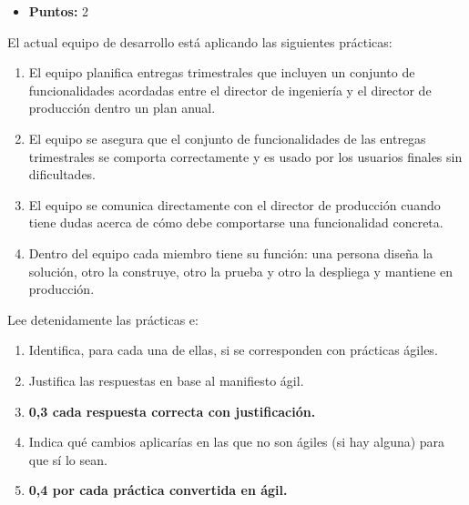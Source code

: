 

\begin{itemize}
    \item \textbf{Puntos:} 2
\end{itemize}
\begin{enunciado}
    El actual equipo de desarrollo está aplicando las siguientes prácticas:
    \begin{enumerate}
        \item El equipo planifica entregas trimestrales que incluyen un conjunto de funcionalidades acordadas entre el director de ingeniería y el director de producción dentro un plan anual.
        \item El equipo se asegura que el conjunto de funcionalidades de las entregas trimestrales se comporta correctamente y es usado por los usuarios finales sin dificultades.
        \item El equipo se comunica directamente con el director de producción cuando tiene dudas acerca de cómo debe comportarse una funcionalidad concreta.
        \item Dentro del equipo cada miembro tiene su función: una persona diseña la solución, otro la construye, otro la prueba y otro la despliega y mantiene en producción.
    \end{enumerate}
    Lee detenidamente las prácticas e:
    \begin{enumerate}
        \item Identifica, para cada una de ellas, si se corresponden con prácticas ágiles.
        \item Justifica las respuestas en base al manifiesto ágil.
        \item \textbf{0,3 cada respuesta correcta con justificación.}
        \item Indica qué cambios aplicarías en las que no son ágiles (si hay alguna) para que sí lo sean.
        \item \textbf{0,4 por cada práctica convertida en ágil.}
    \end{enumerate}
\end{enunciado}

